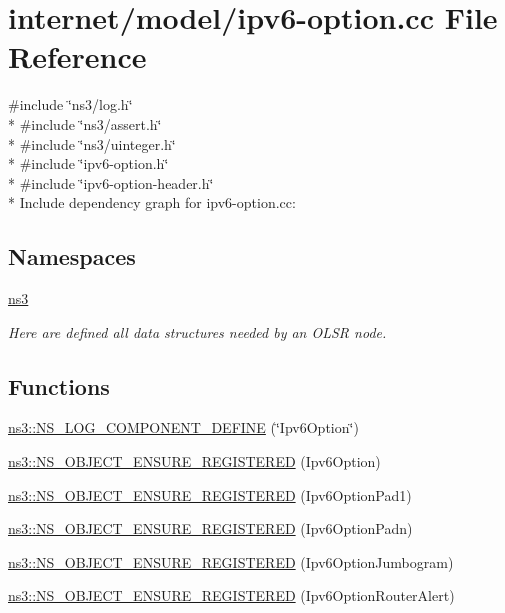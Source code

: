 \hypertarget{ipv6-option_8cc}{}\section{internet/model/ipv6-\/option.cc File Reference}
\label{ipv6-option_8cc}
{\ttfamily \#include \char`\"{}ns3/log.\+h\char`\"{}}\\*
{\ttfamily \#include \char`\"{}ns3/assert.\+h\char`\"{}}\\*
{\ttfamily \#include \char`\"{}ns3/uinteger.\+h\char`\"{}}\\*
{\ttfamily \#include \char`\"{}ipv6-\/option.\+h\char`\"{}}\\*
{\ttfamily \#include \char`\"{}ipv6-\/option-\/header.\+h\char`\"{}}\\*
Include dependency graph for ipv6-\/option.cc\+:
\subsection*{Namespaces}
\begin{DoxyCompactItemize}
\item 
 \hyperlink{namespacens3}{ns3}
\begin{DoxyCompactList}\small\item\em Here are defined all data structures needed by an O\+L\+SR node. \end{DoxyCompactList}\end{DoxyCompactItemize}
\subsection*{Functions}
\begin{DoxyCompactItemize}
\item 
\hyperlink{namespacens3_ae336b943ddb090202e348be6c63a1a7b}{ns3\+::\+N\+S\+\_\+\+L\+O\+G\+\_\+\+C\+O\+M\+P\+O\+N\+E\+N\+T\+\_\+\+D\+E\+F\+I\+NE} (\char`\"{}Ipv6\+Option\char`\"{})
\item 
\hyperlink{namespacens3_a8769583cb38b98933784f755634c0bde}{ns3\+::\+N\+S\+\_\+\+O\+B\+J\+E\+C\+T\+\_\+\+E\+N\+S\+U\+R\+E\+\_\+\+R\+E\+G\+I\+S\+T\+E\+R\+ED} (Ipv6\+Option)
\item 
\hyperlink{namespacens3_a345e25e0523e4e0b41b2dadeb9d2ed46}{ns3\+::\+N\+S\+\_\+\+O\+B\+J\+E\+C\+T\+\_\+\+E\+N\+S\+U\+R\+E\+\_\+\+R\+E\+G\+I\+S\+T\+E\+R\+ED} (Ipv6\+Option\+Pad1)
\item 
\hyperlink{namespacens3_a1a75715ced2668e53ae0c4d40b8dbbe4}{ns3\+::\+N\+S\+\_\+\+O\+B\+J\+E\+C\+T\+\_\+\+E\+N\+S\+U\+R\+E\+\_\+\+R\+E\+G\+I\+S\+T\+E\+R\+ED} (Ipv6\+Option\+Padn)
\item 
\hyperlink{namespacens3_abf6f97d87ea7a80278a6af996f0ca75a}{ns3\+::\+N\+S\+\_\+\+O\+B\+J\+E\+C\+T\+\_\+\+E\+N\+S\+U\+R\+E\+\_\+\+R\+E\+G\+I\+S\+T\+E\+R\+ED} (Ipv6\+Option\+Jumbogram)
\item 
\hyperlink{namespacens3_a6098ca2e61042a627da3b7b4693b9567}{ns3\+::\+N\+S\+\_\+\+O\+B\+J\+E\+C\+T\+\_\+\+E\+N\+S\+U\+R\+E\+\_\+\+R\+E\+G\+I\+S\+T\+E\+R\+ED} (Ipv6\+Option\+Router\+Alert)
\end{DoxyCompactItemize}

